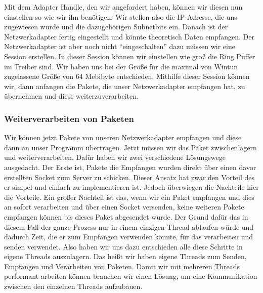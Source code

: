 Mit dem Adapter Handle, den wir angefordert haben, können wir diesen nun einstellen so wie wir ihn benötigen. Wir stellen also die IP-Adresse, die uns zugewiesen wurde und die dazugehörigen Subnetbits ein. Danach ist der Netzwerkadapter fertig eingestellt und könnte theoretisch Daten empfangen.
\newline
\newline
Der Netzwerkadapter ist aber noch nicht “eingeschalten” dazu müssen wir eine Session erstellen. In dieser Session können wir einstellen wie groß die Ring Puffer im Treiber sind. Wir haben uns bei der Größe für die maximal von Wintun zugelassene Größe von 64 Mebibyte entschieden. Mithilfe dieser Session können wir, dann anfangen die Pakete, die unser Netzwerkadapter empfangen hat, zu übernehmen und diese weiterzuverarbeiten.
\subsubsection{Weiterverarbeiten von Paketen}
Wir können jetzt Pakete von unseren Netzwerkadapter empfangen und diese dann an unser Programm übertragen. Jetzt müssen wir das Paket zwischenlagern und weiterverarbeiten. Dafür haben wir zwei verschiedene Lösungswege ausgedacht. 
\newline
\newline
Der Erste ist, Pakete die Empfangen wurden direkt über einen davor erstellten Socket zum Server zu schicken.  Dieser Ansatz hat zwar den Vorteil des er simpel und einfach zu implementieren ist. Jedoch überwiegen die Nachteile hier die Vorteile. 
\newline
\newline
Ein großer Nachteil ist das, wenn wir ein Paket empfangen und dies an sofort verarbeiten und über einen Socket versenden, keine weiteren Pakete empfangen können bis dieses Paket abgesendet wurde. Der Grund dafür das in diesem Fall der ganze Prozess nur in einem einzigen Thread ablaufen würde und dadurch Zeit, die er zum Empfangen verwenden könnte, für das verarbeiten und senden verwendet.
\newline
\newline
Also haben wir uns dazu entschieden alle diese Schritte in eigene Threads auszulagern. Das heißt wir haben eigene Threads zum Senden, Empfangen und Verarbeiten von Paketen. Damit wir mit mehreren Threads performant arbeiten können brauchen wir einen Lösung, um eine Kommunikation zwischen den einzelnen Threads aufzubauen.
